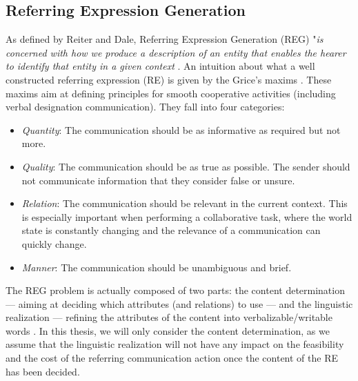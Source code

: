 \documentclass[a4paper,11pt,twoside]{StyleThese}
\begin{document}
\subsection{Referring Expression Generation}
As defined by Reiter and Dale, Referring Expression Generation (REG) "\textit{is concerned with how we produce a description of an entity that enables the hearer to identify that entity in a given context} \cite{reiter1997building}. An intuition about what a well constructed referring expression (RE) is given by the Grice's maxims \cite{grice1975logic}. These maxims aim at defining principles for smooth cooperative activities (including verbal designation communication). They fall into four categories:
\begin{itemize}
\item \textit{Quantity}: The communication should be as informative as required but not more.
\item \textit{Quality}: The communication should be as true as possible. The sender should not communicate information that they consider false or unsure.
\item \textit{Relation}: The communication should be relevant in the current context. This is especially important when performing a collaborative task, where the world state is constantly changing and the relevance of a communication can quickly change.
\item \textit{Manner}: The communication should be unambiguous and brief.
\end{itemize}

The REG problem is actually composed of two parts: the content determination --- aiming at deciding which attributes (and relations) to use --- and the linguistic realization --- refining the attributes of the content into verbalizable/writable words \cite{krahmer2012computational}. In this thesis, we will only consider the content determination, as we assume that the linguistic realization will not have any impact on the feasibility and the cost of the referring communication action once the content of the RE has been decided.
\end{document}
